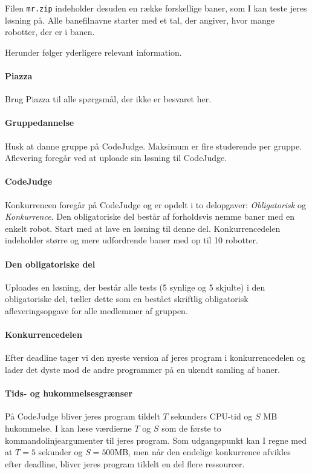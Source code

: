 \documentclass[10pt, a4paper]{article}
\begin{document}
Filen \texttt{mr.zip} indeholder desuden en række forskellige baner, som I kan teste jeres løsning på.
Alle banefilnavne starter med et tal, der angiver, hvor mange robotter, der er i banen.

Herunder følger yderligere relevant information.

\paragraph{Piazza} Brug Piazza til alle spørgsmål, der ikke er besvaret her.

\paragraph{Gruppedannelse} Husk at danne gruppe på CodeJudge.
Maksimum er fire studerende per gruppe.
Aflevering foregår ved at uploade sin løsning til CodeJudge.

\paragraph{CodeJudge} Konkurrencen foregår på CodeJudge og er opdelt i to delopgaver: \emph{Obligatorisk} og \emph{Konkurrence}.
Den obligatoriske del består af forholdsvis nemme baner med en enkelt robot.
Start med at lave en løsning til denne del.
Konkurrencedelen indeholder større og mere udfordrende baner med op til 10 robotter.

\paragraph{Den obligatoriske del} Uploades en løsning, der består alle tests (5 synlige og 5 skjulte) i den obligatoriske del, tæller dette som en bestået skriftlig obligatorisk afleveringsopgave for alle medlemmer af gruppen.

\paragraph{Konkurrencedelen} Efter deadline tager vi den nyeste version af jeres program i konkurrencedelen og lader det dyste mod de andre programmer på en ukendt samling af baner.

\paragraph{Tids- og hukommelsesgrænser} På CodeJudge bliver jeres program tildelt $T$ sekunders CPU-tid og $S$ MB hukommelse. I kan læse værdierne $T$ og $S$ som de første to kommandolinjeargumenter til jeres program. Som udgangspunkt kan I regne med at $T=5$ sekunder og $S=500$MB, men når den endelige konkurrence afvikles efter deadline, bliver jeres program tildelt en del flere ressourcer.
\end{document}
